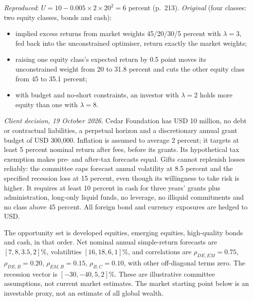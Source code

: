 \begin{qfmethod}
 \emph{Reproduced}: $U=10-0.005\times2\times20^2=6$ percent (p.~213). \emph{Original} (four classes: two equity classes, bonds and cash):
\begin{itemize}
\item implied excess returns from market weights 45/20/30/5 percent with $\lambda=3$, fed back into the unconstrained optimiser, return exactly the market weights;
\item raising one equity class's expected return by 0.5 point moves its unconstrained weight from 20 to 31.8 percent and cuts the other equity class from 45 to 35.1 percent;
\item with budget and no-short constraints, an investor with $\lambda=2$ holds more equity than one with $\lambda=8$.
\end{itemize}

\emph{Client decision, 19 October 2026.} Cedar Foundation has USD 10 million, no debt or contractual liabilities, a perpetual horizon and a discretionary annual grant budget of USD 300{,}000. Inflation is assumed to average 2 percent; it targets at least 5 percent nominal return after fees, before its grants. Its hypothetical tax exemption makes pre- and after-tax forecasts equal. Gifts cannot replenish losses reliably: the committee caps forecast annual volatility at 8.5 percent and the specified recession loss at 15 percent, even though its willingness to take risk is higher. It requires at least 10 percent in cash for three years' grants plus administration, long-only liquid funds, no leverage, no illiquid commitments and no class above 45 percent. All foreign bond and currency exposures are hedged to USD.

The opportunity set is developed equities, emerging equities, high-quality bonds and cash, in that order. Net nominal annual simple-return forecasts are $[7,8,3.5,2]\%$, volatilities $[16,18,6,1]\%$, and correlations are $\rho_{DE,EM}=0.75$, $\rho_{DE,B}=0.20$, $\rho_{EM,B}=0.15$, $\rho_{B,C}=0.10$, with other off-diagonal terms zero. The recession vector is $[-30,-40,5,2]\%$. These are illustrative committee assumptions, not current market estimates. The market starting point below is an investable proxy, not an estimate of all global wealth.


\end{qfmethod}
